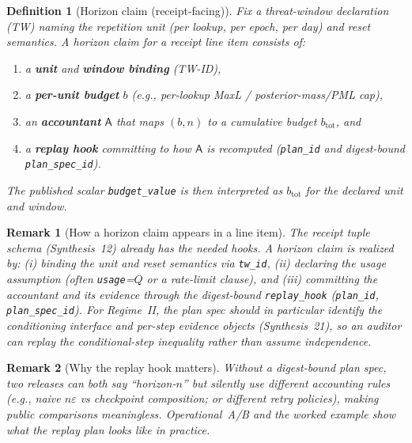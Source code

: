 \documentclass[11pt]{article}
\newtheorem{definition}{Definition}
\newtheorem{remark}{Remark}
\newcommand{\eps}{\varepsilon}
\begin{document}
\begin{definition}[Horizon claim (receipt-facing)]\label{def:horizonclaim}
Fix a threat-window declaration (TW) naming the repetition unit (per lookup, per epoch, per day) and reset semantics.\cite{series:threatwindows}
A \emph{horizon claim} for a receipt line item consists of:
\begin{enumerate}[leftmargin=*]
\item a \textbf{unit} and \textbf{window binding} (TW-ID),
\item a \textbf{per-unit budget} $b$ (e.g., per-lookup MaxL / posterior-mass/PML cap),
\item an \textbf{accountant} $\mathsf{A}$ that maps $(b,n)$ to a cumulative budget $b_{\mathrm{tot}}$, and
\item a \textbf{replay hook} committing to how $\mathsf{A}$ is recomputed (\texttt{plan\_id} and digest-bound \texttt{plan\_spec\_id}).\cite{series:receiptitems,series:planstateequiv}
\end{enumerate}
The published scalar \texttt{budget\_value} is then interpreted as $b_{\mathrm{tot}}$ for the declared unit and window.
\end{definition}



\begin{remark}[How a horizon claim appears in a line item]
The receipt tuple schema (Synthesis~12) already has the needed hooks.\cite{series:receiptitems}
A horizon claim is realized by:
(i) binding the unit and reset semantics via \texttt{tw\_id},
(ii) declaring the usage assumption (often \texttt{usage}=$Q$ or a rate-limit clause), and
(iii) committing the \emph{accountant} and its evidence through the digest-bound \texttt{replay\_hook} (\texttt{plan\_id}, \texttt{plan\_spec\_id}).\cite{series:planstateequiv}
For Regime~II, the plan spec should in particular identify the conditioning interface and per-step evidence objects (Synthesis~21), so an auditor can replay the conditional-step inequality rather than assume independence.\cite{series:condcert}
\end{remark}

\begin{remark}[Why the replay hook matters]
Without a digest-bound plan spec, two releases can both say ``horizon-$n$'' but silently use different accounting rules (e.g., naive $n\eps$ vs checkpoint composition; or different retry policies), making public comparisons meaningless.
Operational~A/B and the worked example show what the replay plan looks like in practice.\cite{series:operationalA,series:operationalB,series:workedexample}
\end{remark}
\end{document}
